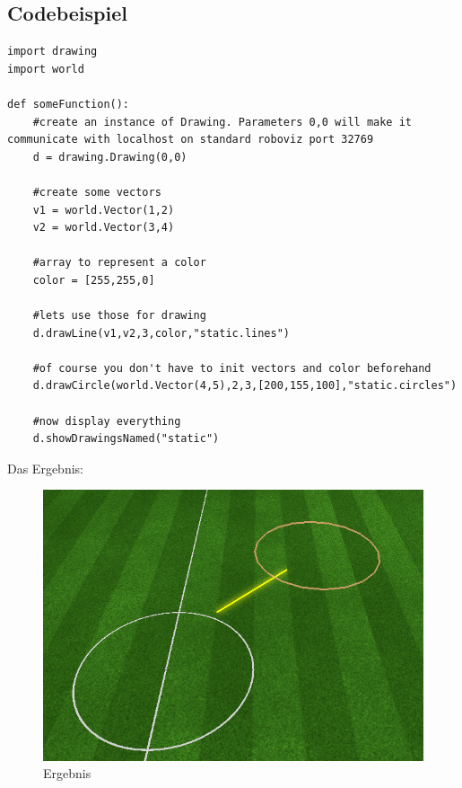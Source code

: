\subsection{Codebeispiel}
\begin{verbatim}import drawing
import world

def someFunction():
    #create an instance of Drawing. Parameters 0,0 will make it communicate with localhost on standard roboviz port 32769
    d = drawing.Drawing(0,0)

    #create some vectors
    v1 = world.Vector(1,2)
    v2 = world.Vector(3,4)
    
    #array to represent a color
    color = [255,255,0]

    #lets use those for drawing
    d.drawLine(v1,v2,3,color,"static.lines")

    #of course you don't have to init vectors and color beforehand
    d.drawCircle(world.Vector(4,5),2,3,[200,155,100],"static.circles")

    #now display everything
    d.showDrawingsNamed("static")
\end{verbatim}
Das Ergebnis:\\
\begin{figure}[h]
\begin{center}
\includegraphics[scale=0.5]{CodeBeispielDraw} 
\end{center}
\caption{Ergebnis}
\end{figure}\\
